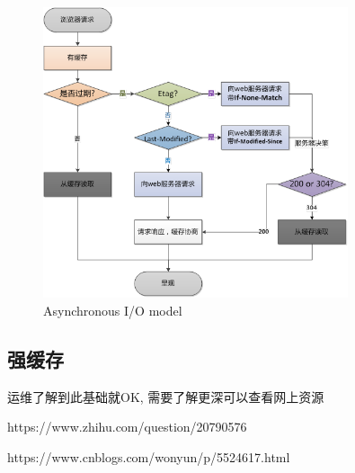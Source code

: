 \begin{figure}[!ht]
    \centering    
     \caption{\label{Fig:async} Asynchronous I/O model}
    \includegraphics[width=0.8\textwidth]{./images/nextRequest.png}  
\end{figure}

\subsection{强缓存}

运维了解到此基础就OK, 需要了解更深可以查看网上资源

https://www.zhihu.com/question/20790576

https://www.cnblogs.com/wonyun/p/5524617.html

